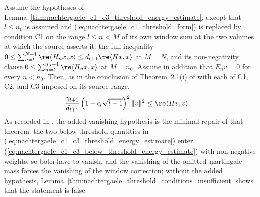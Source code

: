 \begin{lemma}
    \label{thm:nachtergaele_c1_c3_below_threshold_energy_estimate}
    \leanok
    Assume the hypotheses of
    Lemma~\ref{thm:nachtergaele_c1_c3_threshold_energy_estimate}, except
    that $l\leq n_0$ is assumed and
    (\ref{eq:nachtergaele_c1_threshold_form}) is replaced by condition C1 on
    the range $l\leq n<M$ of its own window sum at the two volumes at which
    the source asserts it: the full inequality
    $0\leq\sum_{n=l}^{N-1}\re\langle H_nx,x\rangle
        \leq d_{l+1}\re\langle Hx,x\rangle$ at $M=N$, and its non-negativity
    clause $0\leq\sum_{n=l}^{n_0-1}\re\langle H_nx,x\rangle$ at $M=n_0$.
    Assume in addition that $E_nv=0$ for every $n<n_0$. Then, as in the
    conclusion of Theorem~2.1(i) of \cite{Nachtergaele1996Spectral} with each
    of C1, C2, and C3 imposed on its source range,
    \begin{align}
        \frac{\gamma_{l+1}}{d_{l+1}}
        \left(1-\epsilon_l\sqrt{l+1}\right)^2\lVert v\rVert^2
         & \leq\re\langle Hv,v\rangle.
        \label{eq:nachtergaele_c1_c3_below_threshold_energy_estimate}
    \end{align}
    As recorded in \cite{gap:nachtergaele96_theorem_2_1_lower_endpoint}, the
    added vanishing hypothesis is the minimal repair of that theorem: the two
    below-threshold quantities in
    (\ref{eq:nachtergaele_c1_c3_threshold_energy_estimate}) enter
    (\ref{eq:nachtergaele_c1_c3_below_threshold_energy_estimate}) with
    non-negative weights, so both have to vanish, and the vanishing of the
    omitted martingale mass forces the vanishing of the window correction;
    without the added hypothesis,
    Lemma~\ref{thm:nachtergaele_threshold_conditions_insufficient} shows
    that the statement is false.
\end{lemma}

